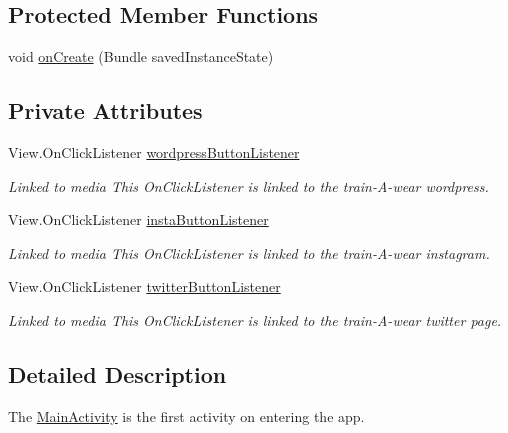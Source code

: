 \subsection*{Protected Member Functions}
\begin{DoxyCompactItemize}
\item 
void \mbox{\hyperlink{classcom_1_1example_1_1trainawearapplication_1_1_main_activity_ab22dede000985c356ec6d4419f3d2825}{on\+Create}} (Bundle saved\+Instance\+State)
\end{DoxyCompactItemize}
\subsection*{Private Attributes}
\begin{DoxyCompactItemize}
\item 
View.\+On\+Click\+Listener \mbox{\hyperlink{classcom_1_1example_1_1trainawearapplication_1_1_main_activity_a24be9aa01bd26567f9846c8007a979bd}{wordpress\+Button\+Listener}}
\begin{DoxyCompactList}\small\item\em Linked to media This On\+Click\+Listener is linked to the train-\/\+A-\/wear wordpress. \end{DoxyCompactList}\item 
View.\+On\+Click\+Listener \mbox{\hyperlink{classcom_1_1example_1_1trainawearapplication_1_1_main_activity_a46b1c1063fc63c8850150682ceef4d5b}{insta\+Button\+Listener}}
\begin{DoxyCompactList}\small\item\em Linked to media This On\+Click\+Listener is linked to the train-\/\+A-\/wear instagram. \end{DoxyCompactList}\item 
View.\+On\+Click\+Listener \mbox{\hyperlink{classcom_1_1example_1_1trainawearapplication_1_1_main_activity_adcd1acce2d6a6b0b3d3c880d961e9e01}{twitter\+Button\+Listener}}
\begin{DoxyCompactList}\small\item\em Linked to media This On\+Click\+Listener is linked to the train-\/\+A-\/wear twitter page. \end{DoxyCompactList}\end{DoxyCompactItemize}


\subsection{Detailed Description}
The \mbox{\hyperlink{classcom_1_1example_1_1trainawearapplication_1_1_main_activity}{Main\+Activity}} is the first activity on entering the app. 

